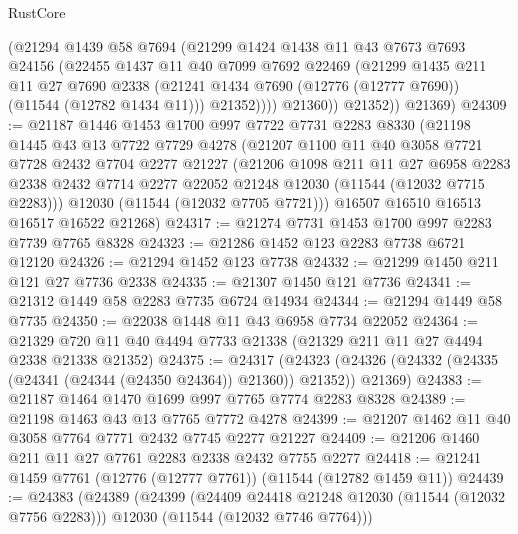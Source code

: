 \begin{lexlean}{RustCore}
\begin{coremodule}
              (@21294
                @1439
                @58
                @7694
                (@21299
                  @1424
                  @1438
                  @11
                  @43
                  @7673
                  @7693
                  @24156
                  (@22455
                    @1437
                    @11
                    @40
                    @7099
                    @7692
                    @22469
                    (@21299
                      @1435
                      @211
                      @11
                      @27
                      @7690
                      @2338
                      (@21241 @1434 @7690 (@12776 (@12777 @7690)) (@11544 (@12782 @1434 @11)))
                      @21352))))
              @21360))
          @21352))
      @21369)
@24309 := @21187
    @1446
    @1453
    @1700
    @997
    @7722
    @7731
    @2283
    @8330
    (@21198
      @1445
      @43
      @13
      @7722
      @7729
      @4278
      (@21207
        @1100
        @11
        @40
        @3058
        @7721
        @7728
        @2432
        @7704
        @2277
        @21227
        (@21206
          @1098
          @211
          @11
          @27
          @6958
          @2283
          @2338
          @2432
          @7714
          @2277
          @22052
          @21248
          @12030
          (@11544 (@12032 @7715 @2283)))
        @12030
        (@11544 (@12032 @7705 @7721)))
      @16507
      @16510
      @16513
      @16517
      @16522
      @21268)
@24317 := @21274 @7731 @1453 @1700 @997 @2283 @7739 @7765 @8328
@24323 := @21286 @1452 @123 @2283 @7738 @6721 @12120
@24326 := @21294 @1452 @123 @7738
@24332 := @21299 @1450 @211 @121 @27 @7736 @2338
@24335 := @21307 @1450 @121 @7736
@24341 := @21312 @1449 @58 @2283 @7735 @6724 @14934
@24344 := @21294 @1449 @58 @7735
@24350 := @22038 @1448 @11 @43 @6958 @7734 @22052
@24364 := @21329 @720 @11 @40 @4494 @7733 @21338 (@21329 @211 @11 @27 @4494 @2338 @21338 @21352)
@24375 := @24317
    (@24323 (@24326 (@24332 (@24335 (@24341 (@24344 (@24350 @24364)) @21360)) @21352)) @21369)
@24383 := @21187 @1464 @1470 @1699 @997 @7765 @7774 @2283 @8328
@24389 := @21198 @1463 @43 @13 @7765 @7772 @4278
@24399 := @21207 @1462 @11 @40 @3058 @7764 @7771 @2432 @7745 @2277 @21227
@24409 := @21206 @1460 @211 @11 @27 @7761 @2283 @2338 @2432 @7755 @2277
@24418 := @21241 @1459 @7761 (@12776 (@12777 @7761)) (@11544 (@12782 @1459 @11))
@24439 := @24383
    (@24389
      (@24399
        (@24409 @24418 @21248 @12030 (@11544 (@12032 @7756 @2283)))
        @12030
        (@11544 (@12032 @7746 @7764)))

\end{coremodule}
\end{lexlean}
